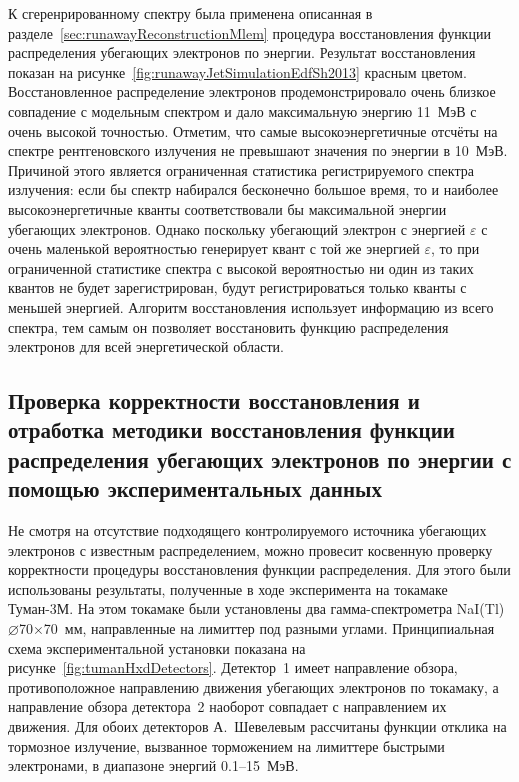 К сгеренрированному спектру была применена описанная в разделе~\ref{sec:runawayReconstructionMlem} процедура восстановления функции распределения убегающих электронов по энергии. Результат восстановления показан на рисунке~\ref{fig:runawayJetSimulationEdfSh2013} красным цветом. Восстановленное распределение электронов продемонстрировало очень близкое совпадение с модельным спектром и дало максимальную энергию 11~МэВ с очень высокой точностью. Отметим, что самые высокоэнергетичные отсчёты на спектре рентгеновского излучения не превышают значения по энергии в 10~МэВ. Причиной этого является ограниченная статистика регистрируемого спектра излучения: если бы спектр набирался бесконечно большое время, то и наиболее высокоэнергетичные кванты соответствовали бы максимальной энергии убегающих электронов. Однако поскольку убегающий электрон с энергией $\varepsilon$ с очень маленькой вероятностью генерирует квант с той же энергией $\varepsilon$, то при ограниченной статистике спектра с высокой вероятностью ни один из таких квантов не будет зарегистрирован, будут регистрироваться только кванты с меньшей энергией. Алгоритм восстановления использует информацию из всего спектра, тем самым он позволяет восстановить функцию распределения электронов для всей энергетической области.~\cite{Shevelev2013}


\subsection{ Проверка корректности восстановления и отработка методики восстановления функции распределения убегающих электронов по энергии с помощью экспериментальных данных }

Не смотря на отсутствие подходящего контролируемого источника убегающих электронов с известным распределением, можно провесит косвенную проверку корректности процедуры восстановления функции распределения. Для этого были использованы результаты, полученные в ходе эксперимента на токамаке Туман-3М. На этом токамаке были установлены два гамма-спектрометра NaI(Tl) $\varnothing$70$\times$70~мм, направленные на лимиттер под разными углами. Принципиальная схема экспериментальной установки показана на рисунке~\ref{fig:tumanHxdDetectors}. Детектор~1 имеет направление обзора, противоположное направлению движения убегающих электронов по токамаку, а направление обзора детектора~2 наоборот совпадает с направлением их движения. Для обоих детекторов А.~Шевелевым рассчитаны функции отклика на тормозное излучение, вызванное торможением на лимиттере быстрыми электронами, в диапазоне энергий 0.1--15~МэВ. 

